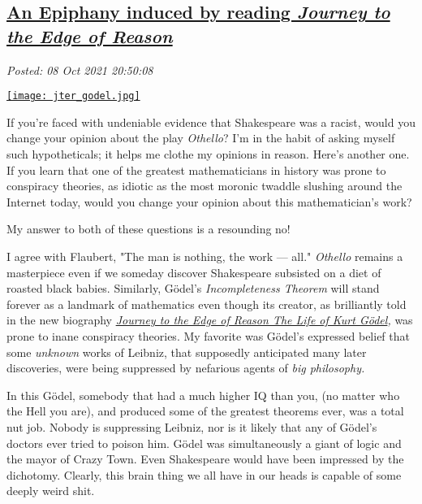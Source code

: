 %

\subsection*{\href{http://analyzethedatanotthedrivel.org/2021/10/08/an-epiphany-induced-by-reading-journey-to-the-edge-of-reason/}{An Epiphany induced by reading \emph{Journey to the Edge of Reason}}}


\noindent\emph{Posted: 08 Oct 2021 20:50:08}
\vspace{6pt}

\captionsetup[floatingfigure]{labelformat=empty}
\begin{floatingfigure}[r]{0.23\textwidth}
\centering
\href{https://www.goodreads.com/book/show/55298400-journey-to-the-edge-of-reason}{\texttt{[image: jter\_godel.jpg]}}
\label{fig:7238x0}
\end{floatingfigure}
If you're faced with undeniable evidence that Shakespeare was a racist,
would you change your opinion about the play \emph{Othello}? I'm in the
habit of asking myself such hypotheticals; it helps me clothe my
opinions in reason. Here's another one. If you learn that one of the
greatest mathematicians in history was prone to conspiracy theories, as
idiotic as the most moronic twaddle slushing around the Internet today,
would you change your opinion about this mathematician's work?

My answer to both of these questions is a resounding no!

I agree with Flaubert, "The man is nothing, the work --- all."
\emph{Othello} remains a masterpiece even if we someday discover
Shakespeare subsisted on a diet of roasted black babies. Similarly,
Gödel's \emph{Incompleteness Theorem} will stand forever as a landmark
of mathematics even though its creator, as brilliantly told in the new
biography
\href{https://www.goodreads.com/book/show/55298400-journey-to-the-edge-of-reason}{\emph{Journey
to the Edge of Reason The Life of Kurt Gödel}}\emph{,} was prone to
inane conspiracy theories. My favorite was Gödel's expressed belief that
some \emph{unknown} works of Leibniz, that supposedly anticipated many
later discoveries, were being suppressed by nefarious agents of
\emph{big philosophy.}

In this Gödel, somebody that had a much higher IQ than you, (no matter
who the Hell you are), and produced some of the greatest theorems ever,
was a total nut job. Nobody is suppressing Leibniz, nor is it likely
that any of Gödel's doctors ever tried to poison him. Gödel was
simultaneously a giant of logic and the mayor of Crazy Town. Even
Shakespeare would have been impressed by the dichotomy. Clearly, this
brain thing we all have in our heads is capable of some deeply weird
shit.

